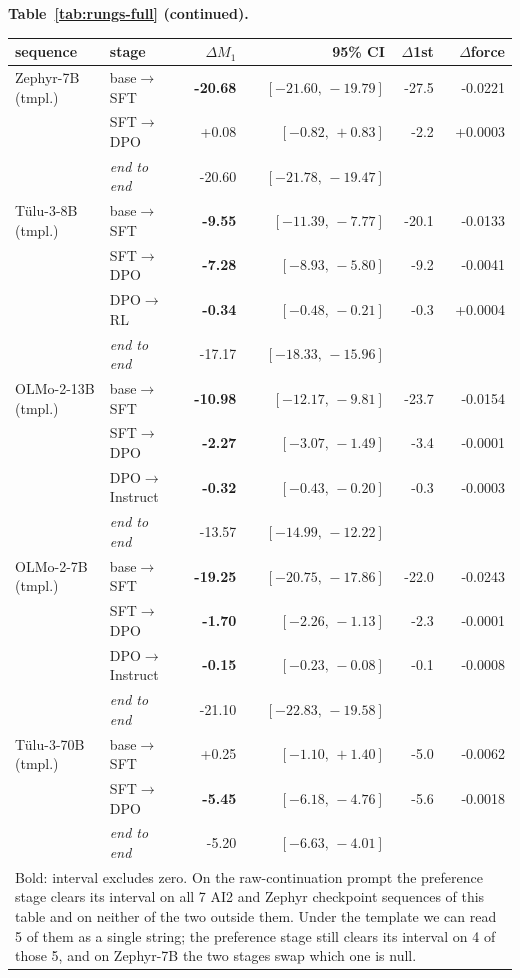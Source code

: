 \begin{table}[tb]
\centering\small
\textbf{Table~\ref{tab:rungs-full} (continued).}\\[3pt]
\begin{tabular}{llrrrr}
\toprule
sequence & stage & $\Delta M_1$ & 95\% CI & $\Delta$1st & $\Delta$force \\
\midrule
Zephyr-7B (tmpl.) & base$\rightarrow$SFT & \textbf{-20.68} & $[-21.60,\,-19.79]$ & -27.5 & -0.0221 \\
                 & SFT$\rightarrow$DPO & +0.08 & $[-0.82,\,+0.83]$ & -2.2 & +0.0003 \\
 & \emph{end to end} & -20.60 & $[-21.78,\,-19.47]$ & & \\
\midrule
Tülu-3-8B (tmpl.) & base$\rightarrow$SFT & \textbf{-9.55} & $[-11.39,\,-7.77]$ & -20.1 & -0.0133 \\
                 & SFT$\rightarrow$DPO & \textbf{-7.28} & $[-8.93,\,-5.80]$ & -9.2 & -0.0041 \\
                 & DPO$\rightarrow$RL & \textbf{-0.34} & $[-0.48,\,-0.21]$ & -0.3 & +0.0004 \\
 & \emph{end to end} & -17.17 & $[-18.33,\,-15.96]$ & & \\
\midrule
OLMo-2-13B (tmpl.) & base$\rightarrow$SFT & \textbf{-10.98} & $[-12.17,\,-9.81]$ & -23.7 & -0.0154 \\
                 & SFT$\rightarrow$DPO & \textbf{-2.27} & $[-3.07,\,-1.49]$ & -3.4 & -0.0001 \\
                 & DPO$\rightarrow$Instruct & \textbf{-0.32} & $[-0.43,\,-0.20]$ & -0.3 & -0.0003 \\
 & \emph{end to end} & -13.57 & $[-14.99,\,-12.22]$ & & \\
\midrule
OLMo-2-7B (tmpl.) & base$\rightarrow$SFT & \textbf{-19.25} & $[-20.75,\,-17.86]$ & -22.0 & -0.0243 \\
                 & SFT$\rightarrow$DPO & \textbf{-1.70} & $[-2.26,\,-1.13]$ & -2.3 & -0.0001 \\
                 & DPO$\rightarrow$Instruct & \textbf{-0.15} & $[-0.23,\,-0.08]$ & -0.1 & -0.0008 \\
 & \emph{end to end} & -21.10 & $[-22.83,\,-19.58]$ & & \\
\midrule
Tülu-3-70B (tmpl.) & base$\rightarrow$SFT & +0.25 & $[-1.10,\,+1.40]$ & -5.0 & -0.0062 \\
                 & SFT$\rightarrow$DPO & \textbf{-5.45} & $[-6.18,\,-4.76]$ & -5.6 & -0.0018 \\
 & \emph{end to end} & -5.20 & $[-6.63,\,-4.01]$ & & \\
\midrule
\multicolumn{6}{p{\linewidth}}{\footnotesize Bold: interval excludes zero. On the raw-continuation prompt the preference stage clears its interval on all 7 AI2 and Zephyr checkpoint sequences of this table and on neither of the two outside them. Under the template we can read 5 of them as a single string; the preference stage still clears its interval on 4 of those 5, and on Zephyr-7B the two stages swap which one is null.}\\
\bottomrule
\end{tabular}
\end{table}
